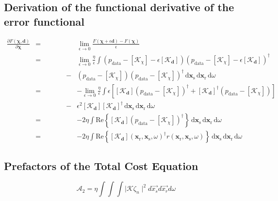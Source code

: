 \documentclass[10pt,a4paper]{article}
\newcommand{\partder}[2]{\ensuremath{\frac{\partial #1}{\partial #2}}}
\newcommand{\df}[1]{\, \ensuremath{\mbox{d}#1}}
\newcommand{\real}[1]{\text{Re} \left\{ #1 \right\}}
\newcommand{\xs}{\mathbf{x}_\text{s}}
\newcommand{\xr}{\mathbf{x}_\text{r}}
\begin{document}
\subsection{Derivation of the functional derivative of the error functional}
\label{deriveerrorfunctional}
\begin{eqnarray*}
\partder{F(\mathbf{\chi}, \mathbf{d})}{\mathbf{\chi}} & = &
\lim_{\epsilon \rightarrow 0} \frac{F(\mathbf{\chi} + \epsilon
\mathbf{d}) - F(\mathbf{\chi})}{\epsilon} \\
& = & \lim_{\epsilon \rightarrow 0} \frac{\eta}{\epsilon} \int
\left(p_{\text{data}} - \left[\mathcal{K}_\chi \right] - \epsilon
\left[\mathcal{K}_\mathbf{d} \right] \right) \left(p_{\text{data}} -
\left[\mathcal{K}_\chi \right] - \epsilon \left[\mathcal{K}_\mathbf{d}
\right] \right)^{\dagger}\\
& \, \, \, \, \, \, \, \, \, \, \, \, \, \, \, \, \, \, \, \, \, \, \,
\, \, \, \, - & \left(p_{\text{data}} - \left[\mathcal{K}_\chi \right]
\right) \left(p_{\text{data}} - \left[\mathcal{K}_\chi \right]
\right)^{\dagger} \df{\xs} \df{\xr} \df{\omega} \\
& = & -\lim_{\epsilon \rightarrow 0} \frac{\eta}{\epsilon} \int
\epsilon \left[ \left[\mathcal{K}_\mathbf{d} \right]
\left(p_{\text{data}} - \left[\mathcal{K}_\chi \right]
\right)^{\dagger} + \left[\mathcal{K}_\mathbf{d} \right]^{\dagger}
\left(p_{\text{data}} - \left[\mathcal{K}_\chi \right] \right) \right]
\\
& \, \, \, \, \, \, \, \, \, \, \, \, \, \, \, \, \, \, \, \, \, \, \,
\, \, \, \, - & \epsilon^2 \left[\mathcal{K}_\mathbf{d} \right]
\left[\mathcal{K}_\mathbf{d} \right]^{\dagger} \df{\xs} \df{\xr}
\df{\omega} \\
& = & -2 \eta \int \real{\left[\mathcal{K}_\mathbf{d} \right]
\left(p_{\text{data}} - \left[\mathcal{K}_\chi \right]
\right)^{\dagger}} \df{\xs} \df{\xr} \df{\omega} \\
& = & -2 \eta \int \real{\left[\mathcal{K}_\mathbf{d} \right](\xr,
\xs, \omega)^{\dagger} r (\xr, \xs, \omega)} \df{\xs} \df{\xr}
\df{\omega}
\end{eqnarray*}

\subsection{Prefactors of the Total Cost Equation}
\label{totalcostprefactors}
\begin{equation} \label{eq:eq24} \mathcal{A}_2 = \eta \int \int \int
\mid \mathcal{K} \zeta_n \mid^2 d\vec{x_s}d\vec{x_r}d\omega
\end{equation}
\end{document}
